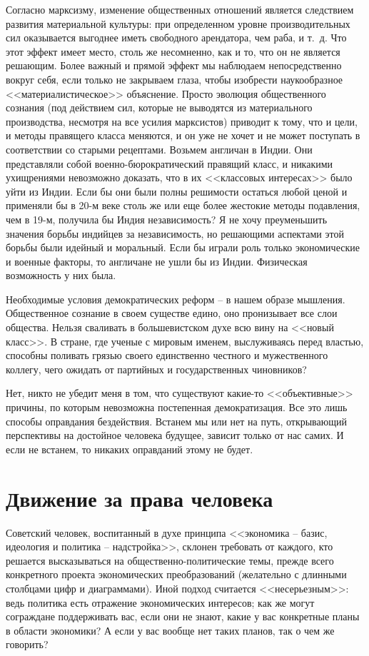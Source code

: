 \documentclass{book}
\begin{document}
Согласно марксизму, изменение общественных отношений является следствием развития материальной культуры: при определенном уровне производительных сил оказывается выгоднее иметь свободного арендатора, чем раба, и т.~д. Что этот эффект имеет место, столь же несомненно, как и то, что он не является решающим. Более важный и прямой эффект мы наблюдаем непосредственно вокруг себя, если только не закрываем глаза, чтобы изобрести наукообразное <<материалистическое>> объяснение. Просто эволюция общественного сознания (под действием сил, которые не выводятся из материального производства, несмотря на все усилия марксистов) приводит к тому, что и цели, и методы правящего класса меняются, и он уже не хочет и не может поступать в соответствии со ста­рыми рецептами. Возьмем англичан в Индии. Они представля­ли собой военно-бюрократический правящий класс, и никаки­ми ухищрениями невозможно доказать, что в их <<классовых интересах>> было уйти из Индии. Если бы они были полны реши­мости остаться любой ценой и применяли бы в 
20-м 
веке столь же или еще более жестокие методы подавления, чем в 19-м, получила бы Индия независимость? Я не хочу преуменьшить значения борьбы индийцев за независимость, но решающими ас­пектами этой борьбы были идейный и моральный. Если бы играли роль только экономические и военные факторы, то англичане не ушли бы из Индии. Физическая возможность у них была.

Необходимые условия демократических реформ -- в нашем образе мышления. Общественное сознание в своем существе едино, оно пронизывает все слои общества. Нельзя сваливать в большевистском духе всю вину на <<новый класс>>. В стране, где ученые с мировым именем, выслуживаясь перед властью, способны поливать грязью своего единственно честного и мужественного коллегу, чего ожидать от партийных и государственных чиновников?

Нет, никто не убедит меня в том, что существуют какие-то <<объективные>> причины, по которым невозможна постепенная демократизация. Все это лишь способы оправдания бездействия. Встанем мы или нет на путь, открывающий перспективы на достойное человека будущее, зависит только от нас самих. И если не встанем, то никаких оправданий этому не будет.



\section{Движение за права человека}

Советский человек, воспитанный в духе принципа <<экономика -- базис, идеология и политика -- надстройка>>, склонен требовать от каждого, кто решается высказываться на обще­ственно-политические темы, прежде всего конкретного проекта экономических преобразований (желательно с длинными столбцами цифр и диаграммами). Иной подход считается <<несерьезным>>: ведь политика есть отражение экономических интересов; как же могут сограждане поддерживать вас, если они не знают, какие у вас конкретные планы в области экономики? А если у вас вообще нет таких планов, так о чем же говорить?
\end{document}
